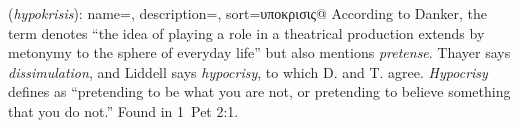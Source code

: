 \item[Hypocrisy,]

(\textit{hypokrisis}):
{
    name=,
    description={},
    sort=υποκρισις@
}
According to Danker, the term denotes ``the idea of playing a role in a theatrical production extends by metonymy to the sphere of everyday life'' but also mentions \emph{pretense}. Thayer says \emph{dissimulation}, and Liddell says \emph{hypocrisy}, to which D. and T. agree. \emph{Hypocrisy} defines as ``pretending to be what you are not, or pretending to believe something that you do not.''
Found in 1~Pet 2:1.
